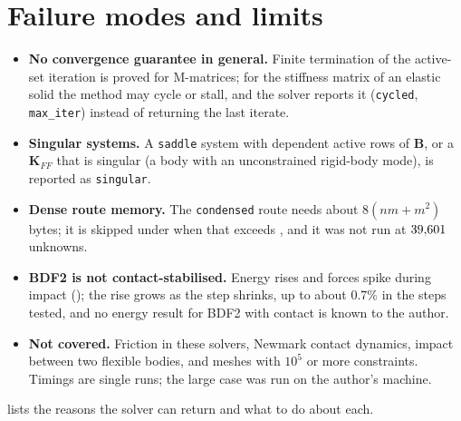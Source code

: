 \section{Failure modes and limits}\label{sec:ct-limits}

\begin{limitsbox}
\begin{itemize}
\item \textbf{No convergence guarantee in general.} Finite termination of the active-set iteration is proved for M-matrices; for the stiffness matrix of an elastic solid the method may cycle or stall, and the solver reports it (\texttt{cycled}, \texttt{max\_iter}) instead of returning the last iterate.
\item \textbf{Singular systems.} A \texttt{saddle} system with dependent active rows of $\bm B$, or a $\bm K_{FF}$ that is singular (a body with an unconstrained rigid-body mode), is reported as \texttt{singular}.
\item \textbf{Dense route memory.} The \texttt{condensed} route needs about $8(nm+m^2)$ bytes; it is skipped under  when that exceeds , and it was not run at $39{,}601$ unknowns.
\item \textbf{BDF2 is not contact-stabilised.} Energy rises and forces spike during impact (); the rise grows as the step shrinks, up to about $0.7\%$ in the steps tested, and no energy result for BDF2 with contact is known to the author.
\item \textbf{Not covered.} Friction in these solvers, Newmark contact dynamics, impact between two flexible bodies, and meshes with $10^5$ or more constraints. Timings are single runs; the large case was run on the author's machine.
\end{itemize}
\end{limitsbox}

 lists the reasons the solver can return and what to do about each.

